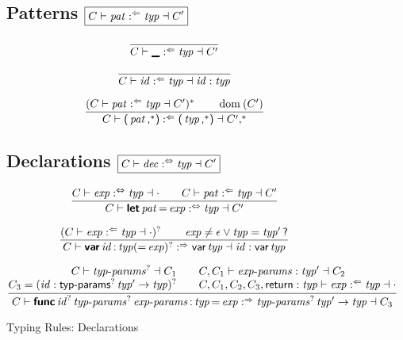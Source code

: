 \begin{figure*}

\subsection*{Patterns \hfill $\boxed{C \vdash \operatorname{\mathit{pat}} :^\Leftarrow \operatorname{\mathit{typ}} \dashv C'}$}

$$
\frac{
}{
  C \vdash \textsf{\sf\textbf{\textunderscore}} :^\Leftarrow \operatorname{\mathit{typ}} \dashv C'
}
$$

$$
\frac{
}{
  C \vdash \operatorname{\mathit{id}} :^\Leftarrow \operatorname{\mathit{typ}} \dashv \operatorname{\mathit{id}} : \operatorname{\mathit{typ}}
}
$$

$$
\frac{
  (C \vdash \x{pat} \anal \x{typ} \dashv C')^\ast
  \qquad
  \Dom(C')
}{
  C \vdash \K( \x{pat}\K,^\ast \K) \anal \K( \x{typ}\K,^\ast \K) \dashv C',^\ast
}
$$


\subsection*{Declarations \hfill $\boxed{C \vdash \operatorname{\mathit{dec}} :^\Leftrightarrow \operatorname{\mathit{typ}} \dashv C'}$}

$$
\frac{
  C \vdash \operatorname{\mathit{exp}} :^\Leftrightarrow \operatorname{\mathit{typ}} \dashv \cdot
  \qquad
  C \vdash \operatorname{\mathit{pat}} :^\Leftarrow \operatorname{\mathit{typ}} \dashv C'
}{
  C \vdash \textsf{\sf\textbf{let}} \operatorname{\mathit{pat}} \textsf{\sf=} \operatorname{\mathit{exp}} :^\Leftrightarrow \operatorname{\mathit{typ}} \dashv C'
}
$$

$$
\frac{
  (C \vdash \operatorname{\mathit{exp}} :^\Leftarrow \operatorname{\mathit{typ}} \dashv \cdot)^?
  \qquad
  \operatorname{\mathit{exp}} \neq \epsilon \vee \operatorname{\mathit{typ}} = \operatorname{\mathit{typ}}' \textsf{\sf?}
}{
  C \vdash \textsf{\sf\textbf{var}} \operatorname{\mathit{id}} \textsf{\sf:} \operatorname{\mathit{typ}} (\textsf{\sf=} \operatorname{\mathit{exp}})^? :^\Rightarrow \textsf{\sf var} \operatorname{\mathit{typ}} \dashv \operatorname{\mathit{id}} : \textsf{\sf var} \operatorname{\mathit{typ}}
}
$$

$$
\frac{
  \begin{array}{@{}r@{\qquad}l@{}}
  C \vdash \x{typ-params}^? \dashv C_1
  &
  C, C_1 \vdash \x{exp-params} : \x{typ}' \dashv C_2
  \\
  C_3 = (\x{id} : \K{typ-params}^? \x{typ}' \Kto \x{typ})^?
  &
  C, C_1, C_2, C_3, \K{return} : \x{typ} \vdash \x{exp} \anal \x{typ} \dashv \cdot
  \end{array}
}{
  C \vdash \KK{func} \x{id}^? \x{typ-params}^? \x{exp-params} \K: \x{typ} \K= \x{exp} \synth \x{typ-params}^? \x{typ}' \Kto \x{typ} \dashv C_3
}
$$

\caption{Typing Rules: Declarations}
\label{fig:typing.dec}

\end{figure*}
